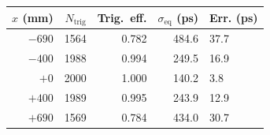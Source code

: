 \begin{tabular}{rrrrl}\toprule
$x$ (mm) & $N_\mathrm{trig}$ & Trig.~eff. & $\sigma_\mathrm{eq}$ (ps) & Err. (ps) \\
\midrule
$-690$ & 1564 & 0.782 & 484.6 & 37.7 \\
$-400$ & 1988 & 0.994 & 249.5 & 16.9 \\
$+0$ & 2000 & 1.000 & 140.2 & 3.8 \\
$+400$ & 1989 & 0.995 & 243.9 & 12.9 \\
$+690$ & 1569 & 0.784 & 434.0 & 30.7 \\
\bottomrule\end{tabular}
